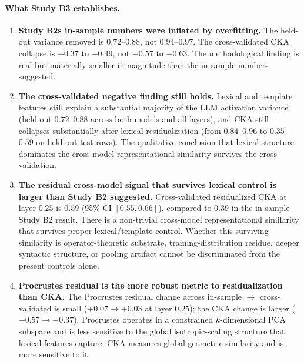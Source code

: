 \paragraph{What Study B3 establishes.}

\begin{enumerate}
    \item \textbf{Study B2s in-sample numbers were inflated by
        overfitting.} The held-out variance removed is $0.72$--$0.88$,
        not $0.94$--$0.97$. The cross-validated CKA collapse is
        $-0.37$ to $-0.49$, not $-0.57$ to $-0.63$. The methodological
        finding is real but materially smaller in magnitude than the
        in-sample numbers suggested.
    \item \textbf{The cross-validated negative finding still holds.}
        Lexical and template features still explain a substantial
        majority of the LLM activation variance (held-out
        $0.72$--$0.88$ across both models and all layers), and CKA
        still collapses substantially after lexical residualization
        (from $0.84$--$0.96$ to $0.35$--$0.59$ on held-out test
        rows). The qualitative conclusion that lexical structure
        dominates the cross-model representational similarity
        survives the cross-validation.
    \item \textbf{The residual cross-model signal that survives
        lexical control is larger than Study B2 suggested.}
        Cross-validated residualized CKA at layer $0.25$ is $0.59$
        (95\% CI $[0.55, 0.66]$), compared to $0.39$ in the in-sample
        Study B2 result. There is a non-trivial cross-model
        representational similarity that survives proper
        lexical/template control. Whether this surviving similarity
        is operator-theoretic substrate, training-distribution
        residue, deeper syntactic structure, or pooling artifact
        cannot be discriminated from the present controls alone.
    \item \textbf{Procrustes residual is the more robust metric to
        residualization than CKA.} The Procrustes residual change
        across in-sample $\to$ cross-validated is small ($+0.07
        \to +0.03$ at layer $0.25$); the CKA change is larger
        ($-0.57 \to -0.37$). Procrustes operates in a constrained
        $k$-dimensional PCA subspace and is less sensitive to the
        global isotropic-scaling structure that lexical features
        capture; CKA measures global geometric similarity and is
        more sensitive to it.
\end{enumerate}

